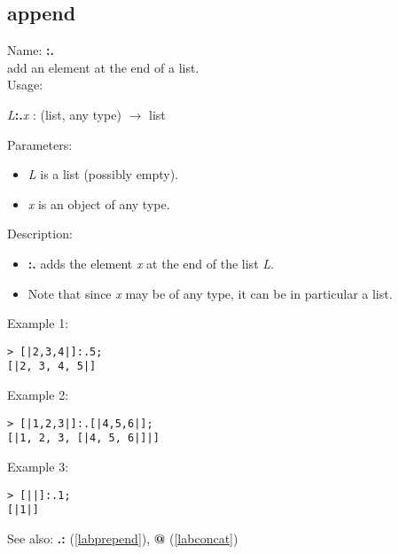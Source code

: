 \subsection{append}
\label{labappend}
\noindent Name: \textbf{:.}\\
add an element at the end of a list.\\
\noindent Usage: 
\begin{center}
\emph{L}\textbf{:.}\emph{x} : (\textsf{list}, \textsf{any type}) $\rightarrow$ \textsf{list}
\\ 
\end{center}
Parameters: 
\begin{itemize}
\item \emph{L} is a list (possibly empty).
\item \emph{x} is an object of any type.
\end{itemize}
\noindent Description: \begin{itemize}

\item \textbf{:.} adds the element \emph{x} at the end of the list \emph{L}.

\item Note that since \emph{x} may be of any type, it can be in particular a list.
\end{itemize}
\noindent Example 1: 
\begin{center}\begin{minipage}{15cm}\begin{Verbatim}[frame=single]
> [|2,3,4|]:.5;
[|2, 3, 4, 5|]
\end{Verbatim}
\end{minipage}\end{center}
\noindent Example 2: 
\begin{center}\begin{minipage}{15cm}\begin{Verbatim}[frame=single]
> [|1,2,3|]:.[|4,5,6|];
[|1, 2, 3, [|4, 5, 6|]|]
\end{Verbatim}
\end{minipage}\end{center}
\noindent Example 3: 
\begin{center}\begin{minipage}{15cm}\begin{Verbatim}[frame=single]
> [||]:.1;
[|1|]
\end{Verbatim}
\end{minipage}\end{center}
See also: \textbf{.:} (\ref{labprepend}), \textbf{@} (\ref{labconcat})

